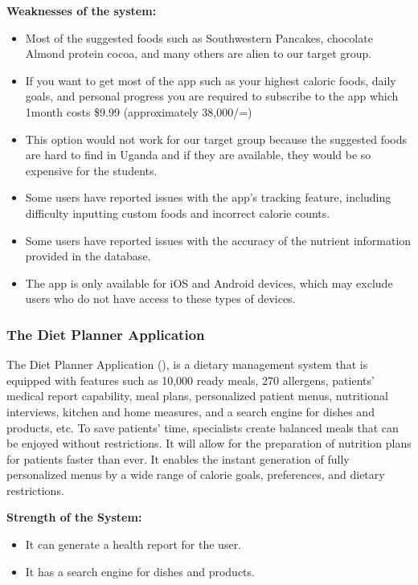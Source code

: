 \documentclass{article}
\begin{document}
\textbf{Weaknesses of the system:}
\begin{itemize}
\item Most of the suggested foods such as Southwestern Pancakes, chocolate Almond protein cocoa, and many others are alien to our target group.
\item If you want to get most of the app such as your highest caloric foods, daily goals, and personal progress you are required to subscribe to the app which 1month costs \$9.99 (approximately 38,000/=)
\item This option would not work for our target group because the suggested foods are hard to find in Uganda and if they are available, they would be so expensive for the students.

\item Some users have reported issues with the app's tracking feature, including difficulty inputting custom foods and incorrect calorie counts.
\item Some users have reported issues with the accuracy of the nutrient information provided in the database.
\item The app is only available for iOS and Android devices, which may exclude users who do not have access to these types of devices.

\end{itemize}

\subsubsection{The Diet Planner Application}

The Diet Planner Application (\cite{dietplannerapp}), is a dietary management system that is equipped with features such as 10,000 ready meals, 270 allergens, patients' medical report capability, meal plans, personalized patient menus, nutritional interviews, kitchen and home measures, and a search engine for dishes and products, etc. To save patients' time, specialists create balanced meals that can be enjoyed without restrictions. It will allow for the preparation of nutrition plans for patients faster than ever. It enables the instant generation of fully personalized menus by a wide range of calorie goals, preferences, and dietary restrictions.

\textbf{Strength of the System:}
\begin{itemize}
\item It can generate a health report for the user.
\item It has a search engine for dishes and products.
\end{itemize}
\end{document}
